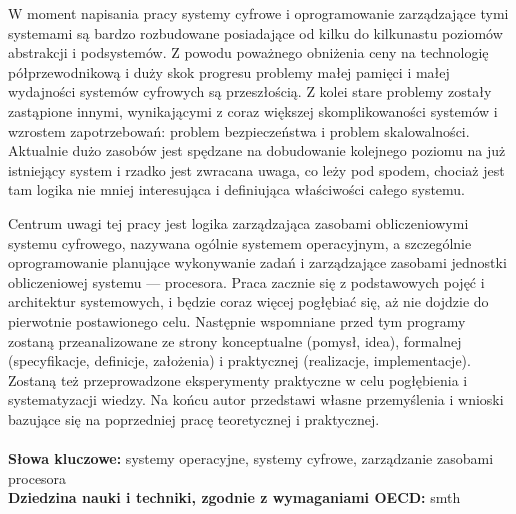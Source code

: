 \documentclass[../main]{subfiles}
\begin{document}
W moment napisania  pracy systemy cyfrowe i oprogramowanie zarządzające tymi
systemami są bardzo rozbudowane posiadające od kilku do kilkunastu poziomów abstrakcji i podsystemów. Z
powodu poważnego obniżenia ceny na technologię półprzewodnikową i duży skok progresu problemy małej
pamięci i małej wydajności systemów cyfrowych są przeszłością. Z kolei stare problemy zostały
zastąpione innymi, wynikającymi z coraz większej skomplikowaności systemów i wzrostem zapotrzebowań:
problem bezpieczeństwa i problem skalowalności. Aktualnie dużo zasobów jest spędzane na dobudowanie
kolejnego poziomu na już istniejący system i rzadko jest zwracana uwaga, co leży pod spodem, chociaż
jest tam logika nie mniej interesująca i definiująca właściwości całego systemu.

Centrum uwagi  tej pracy jest logika zarządzająca zasobami obliczeniowymi systemu
cyfrowego, nazywana ogólnie systemem operacyjnym, a szczególnie oprogramowanie planujące wykonywanie zadań
i zarządzające zasobami jednostki obliczeniowej systemu — procesora. Praca zacznie się z podstawowych
pojęć i architektur systemowych, i będzie coraz więcej pogłębiać się, aż nie dojdzie do pierwotnie
postawionego celu. Następnie wspomniane przed tym programy zostaną przeanalizowane ze strony
konceptualne (pomysł, idea), formalnej (specyfikacje, definicje, założenia) i praktycznej (realizacje,
implementacje). Zostaną też przeprowadzone eksperymenty praktyczne w celu pogłębienia i systematyzacji
wiedzy. Na końcu autor przedstawi własne przemyślenia i wnioski bazujące się na poprzedniej pracę
teoretycznej i praktycznej.
\\
\\
\textbf{Słowa kluczowe:} systemy operacyjne, systemy cyfrowe, zarządzanie zasobami procesora
\\
\textbf{Dziedzina nauki i techniki, zgodnie z wymaganiami OECD:} smth 
\end{document}

